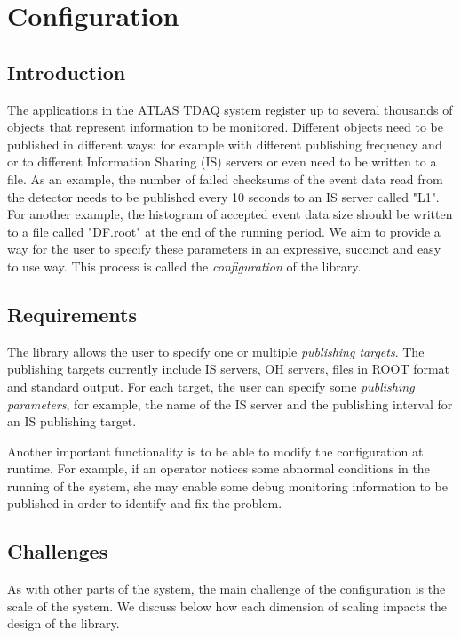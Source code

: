 \chapter{Configuration} %
\label{Capitolul3}

\section{Introduction}

The applications in the ATLAS TDAQ system register up to several thousands of objects that represent information to be monitored. Different objects need to be published in different ways: for example with different publishing frequency and or to different Information Sharing (IS) servers or even need to be written to a file. As an example, the number of failed checksums of the event data read from the detector needs to be published every 10 seconds to an IS server called "L1". For another example, the histogram of accepted event data size should be written to a file called "DF.root" at the end of the running period. We aim to provide a way for the user to specify these parameters in an expressive, succinct and easy to use way. This process is called the \emph{configuration} of the library.

\section{Requirements}

The library allows the user to specify one or multiple \emph{publishing targets}. The publishing targets currently include IS servers, OH servers, files in ROOT format and standard output. For each target, the user can specify some \emph{publishing parameters}, for example, the name of the IS server and the publishing interval for an IS publishing target.

Another important functionality is to be able to modify the configuration at runtime. For example, if an operator notices some abnormal conditions in the running of the system, she may enable some debug monitoring information to be published in order to identify and fix the problem. 

\section{Challenges}

As with other parts of the system, the main challenge of the configuration is the scale of the system. We discuss below how each dimension of scaling impacts the design of the library.

